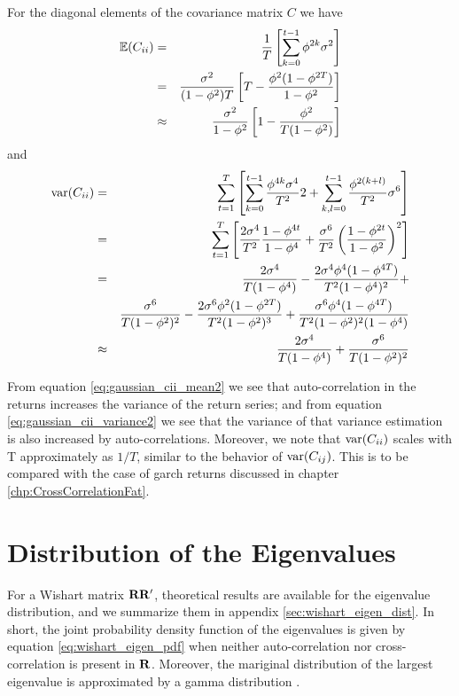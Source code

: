 For the diagonal elements of the covariance matrix $C$ we have
\begin{eqnarray}
  \mathbb{E}(C_{ii}) &=& {1 \over T}\left[
    \sum_{k=0}^{t-1} \phi^{2k} \sigma^2
  \right] \nonumber \\
  &=& {\sigma^2 \over (1 - \phi^2) T} \left[
    T - {\phi^2 (1 - \phi^{2T}) \over 1 - \phi^2}
  \right] \nonumber \\
  & \approx & {\sigma^2 \over 1 - \phi^2} \left[
    1 - {\phi^2 \over T (1 - \phi^2)}
  \right] \label{eq:gaussian_cii_mean2}
\end{eqnarray}
and
\begin{eqnarray}
  \text{var}(C_{ii}) &=& \sum_{t=1}^T \left[
    \sum_{k=0}^{t-1} {\phi^{4k} \sigma^4 \over T^2} 2 +
    \sum_{k,l=0}^{t-1} {\phi^{2(k+l)} \over T^2} \sigma^6
  \right] \nonumber \\
  &=& \sum_{t=1}^T \left[
    {2 \sigma^4 \over T^2} {1 - \phi^{4t} \over 1 - \phi^4} +
    {\sigma^6 \over T^2} \left(
      {1 - \phi^{2t} \over 1- \phi^2}
    \right)^2 \right] \nonumber \\
  &=& {2 \sigma^4 \over T (1 - \phi^4)} -
  {2 \sigma^4 \phi^4 (1 - \phi^{4T}) \over T^2(1 - \phi^4)^2} +
  \nonumber \\
  && {\sigma^6 \over T (1 -\phi^2)^2} -
  {2 \sigma^6 \phi^2 (1 - \phi^{2T}) \over T^2 (1 - \phi^2)^3} +
  {\sigma^6 \phi^4 (1 - \phi^{4T}) \over T^2 (1 - \phi^2)^2 (1 -
    \phi^4)} \nonumber \\
  &\approx& {2 \sigma^4 \over T (1 - \phi^4)} + {\sigma^6 \over T (1
    -\phi^2)^2} \label{eq:gaussian_cii_variance2}
\end{eqnarray}

From equation \ref{eq:gaussian_cii_mean2} we see that auto-correlation
in the returns increases the variance of the return series; and from
equation \ref{eq:gaussian_cii_variance2} we see that the variance of
that variance estimation is also increased by
auto-correlations. Moreover, we note that $\text{var}(C_{ii})$ scales with T
approximately as $1/T$, similar to the behavior of
$\text{var}(C_{ij})$. This is to be compared with the case of \gls{garch}
returns discussed in chapter \ref{chp:CrossCorrelationFat}.

\section{Distribution of the Eigenvalues}
\label{sec:GCC-numerical}
For a Wishart matrix $\mathbf{RR'}$, theoretical results are available
for the eigenvalue distribution, and we summarize them in appendix
\ref{sec:wishart_eigen_dist}. In short, the joint probability density
function of the eigenvalues is given by equation
\ref{eq:wishart_eigen_pdf} when neither auto-correlation nor
cross-correlation is present in $\mathbf{R}$. Moreover, the mariginal
distribution of the largest eigenvalue is approximated by a gamma
distribution \cite{Chiani2012}.

